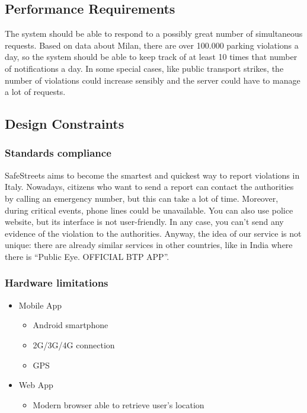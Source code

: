 \subsection{Performance Requirements}
The system should be able to respond to a possibly great number of simultaneous requests. Based on 
data about Milan, there are over 100.000 parking violations a day, so the system should be able to keep 
track of at least 10 times that number of notifications a day. In some special cases, like public transport 
strikes, the number of violations could increase sensibly and the server could have to manage a lot of 
requests.

\subsection{Design Constraints}
\subsubsection{Standards compliance }
SafeStreets aims to become the smartest and quickest way to report violations in Italy. 
Nowadays, citizens who want to send a report can contact the authorities by calling an emergency number, 
but this can take a lot of time. Moreover, during critical events, phone lines could be unavailable. 
You can also use police website, but its interface is not user-friendly. In any case, you can’t send any 
evidence of the violation to the authorities. Anyway, the idea of our service is not unique: there are already 
similar services in other countries, like in India where there is “Public Eye. OFFICIAL BTP APP”.
\subsubsection{Hardware limitations}
\begin{itemize}
\item Mobile App
\begin{itemize}
\item Android smartphone
\item 2G/3G/4G connection
\item GPS
\end{itemize}
\item Web App
\begin{itemize}
\item Modern browser able to retrieve user's location
\end{itemize}
\end{itemize}
